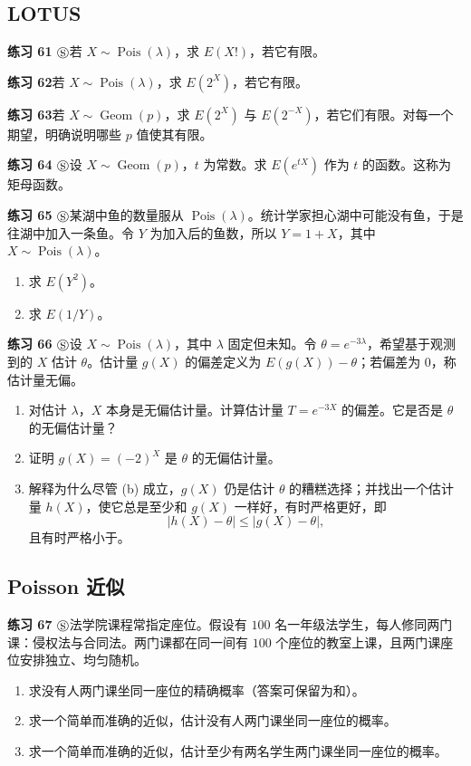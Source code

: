 \documentclass[UTF8, 12pt, fontset=fandol, oneside]{ctexart}
\begin{document}
\subsection*{LOTUS}

\noindent\textbf{练习 61 $\circledS$}\quad 若 $X\sim\operatorname{Pois}(\lambda)$，求 $E(X!)$，若它有限。

\noindent\textbf{练习 62}\quad 若 $X\sim\operatorname{Pois}(\lambda)$，求 $E(2^X)$，若它有限。

\noindent\textbf{练习 63}\quad 若 $X\sim\operatorname{Geom}(p)$，求 $E(2^X)$ 与 $E(2^{-X})$，若它们有限。对每一个期望，明确说明哪些 $p$ 值使其有限。

\noindent\textbf{练习 64 $\circledS$}\quad 设 $X\sim\operatorname{Geom}(p)$，$t$ 为常数。求 $E(e^{tX})$ 作为 $t$ 的函数。这称为矩母函数。

\noindent\textbf{练习 65 $\circledS$}\quad 某湖中鱼的数量服从 $\operatorname{Pois}(\lambda)$。统计学家担心湖中可能没有鱼，于是往湖中加入一条鱼。令 $Y$ 为加入后的鱼数，所以 $Y=1+X$，其中 $X\sim\operatorname{Pois}(\lambda)$。
\begin{enumerate}
  \item[(a)] 求 $E(Y^2)$。
  \item[(b)] 求 $E(1/Y)$。
\end{enumerate}

\noindent\textbf{练习 66 $\circledS$}\quad 设 $X\sim\operatorname{Pois}(\lambda)$，其中 $\lambda$ 固定但未知。令 $\theta=e^{-3\lambda}$，希望基于观测到的 $X$ 估计 $\theta$。估计量 $g(X)$ 的偏差定义为 $E(g(X))-\theta$；若偏差为 $0$，称估计量无偏。
\begin{enumerate}
  \item[(a)] 对估计 $\lambda$，$X$ 本身是无偏估计量。计算估计量 $T=e^{-3X}$ 的偏差。它是否是 $\theta$ 的无偏估计量？
  \item[(b)] 证明 $g(X)=(-2)^X$ 是 $\theta$ 的无偏估计量。
  \item[(c)] 解释为什么尽管 (b) 成立，$g(X)$ 仍是估计 $\theta$ 的糟糕选择；并找出一个估计量 $h(X)$，使它总是至少和 $g(X)$ 一样好，有时严格更好，即
  \[
    |h(X)-\theta|\le |g(X)-\theta|,
  \]
  且有时严格小于。
\end{enumerate}

\subsection*{Poisson 近似}

\noindent\textbf{练习 67 $\circledS$}\quad 法学院课程常指定座位。假设有 $100$ 名一年级法学生，每人修同两门课：侵权法与合同法。两门课都在同一间有 $100$ 个座位的教室上课，且两门课座位安排独立、均匀随机。
\begin{enumerate}
  \item[(a)] 求没有人两门课坐同一座位的精确概率（答案可保留为和）。
  \item[(b)] 求一个简单而准确的近似，估计没有人两门课坐同一座位的概率。
  \item[(c)] 求一个简单而准确的近似，估计至少有两名学生两门课坐同一座位的概率。
\end{enumerate}
\end{document}
